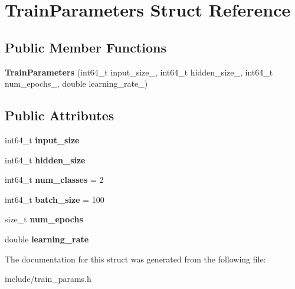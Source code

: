\hypertarget{struct_train_parameters}{}\section{Train\+Parameters Struct Reference}
\label{struct_train_parameters}
\subsection*{Public Member Functions}
\begin{DoxyCompactItemize}
\item 
\mbox{\label{struct_train_parameters_acaeec45398c2090156ffc19625d44626}} 
{\bfseries Train\+Parameters} (int64\+\_\+t input\+\_\+size\+\_\+, int64\+\_\+t hidden\+\_\+size\+\_\+, int64\+\_\+t num\+\_\+epochs\+\_\+, double learning\+\_\+rate\+\_\+)
\end{DoxyCompactItemize}
\subsection*{Public Attributes}
\begin{DoxyCompactItemize}
\item 
\mbox{\label{struct_train_parameters_a29c27e8e824654b77fc82b5c70dc8a03}} 
int64\+\_\+t {\bfseries input\+\_\+size}
\item 
\mbox{\label{struct_train_parameters_a9c359e4eee9a6fc60e4793b4e5792d88}} 
int64\+\_\+t {\bfseries hidden\+\_\+size}
\item 
\mbox{\label{struct_train_parameters_accc7ca6d976c745aeea4cf739a0fa495}} 
int64\+\_\+t {\bfseries num\+\_\+classes} = 2
\item 
\mbox{\label{struct_train_parameters_a631d0ffb1d18e37d0154e20e67ba956d}} 
int64\+\_\+t {\bfseries batch\+\_\+size} = 100
\item 
\mbox{\label{struct_train_parameters_a5fac5d84ccfb08ff00a85bac7690baf9}} 
size\+\_\+t {\bfseries num\+\_\+epochs}
\item 
\mbox{\label{struct_train_parameters_ae814459c8d66e813161aa0a99cd36c47}} 
double {\bfseries learning\+\_\+rate}
\end{DoxyCompactItemize}


The documentation for this struct was generated from the following file\+:\begin{DoxyCompactItemize}
\item 
include/train\+\_\+params.\+h\end{DoxyCompactItemize}
